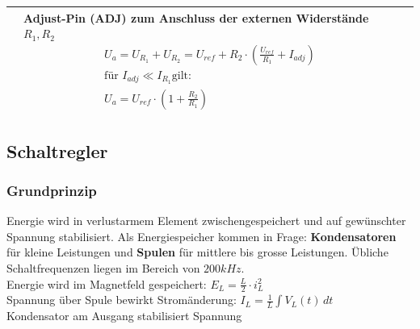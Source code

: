 \begin{longtable}{|l|l|l|}
\begin{minipage}{6cm}
		\end{minipage}
	&
		\begin{minipage}{8cm}
			Adjust-Pin (ADJ) zum Anschluss der externen Widerstände $R_1,R_2$
			\begin{gather*}
				U_a = U_{R_1} + U_{R_2} = U_{ref} + R_2 \cdot 
				\left(\frac{U_{ref}}{R_1} + I_{adj}\right) \\
				\text{für }I_{adj} \ll I_{R_1} \text{gilt:} \\
				U_a = U_{ref} \cdot \left(1+\frac{R_2}{R_1}\right)
			\end{gather*}
		\end{minipage}
	\\ \hline
\end{longtable}

\subsection{Schaltregler}
	\subsubsection{Grundprinzip}
		Energie wird in verlustarmem Element zwischengespeichert und auf gewünschter
		Spannung stabilisiert. Als Energiespeicher kommen in Frage: \textbf{Kondensatoren}
		für kleine Leistungen und \textbf{Spulen} für mittlere bis grosse Leistungen.
		Übliche Schaltfrequenzen liegen im Bereich von $200kHz$. \\
		
		Energie wird im Magnetfeld gespeichert: $E_L = \frac{L}{2} \cdot i_L^2$ \\
		Spannung über Spule bewirkt Stromänderung: $I_L = \frac{1}{L} \int V_L(t) \, dt$ \\
		Kondensator am Ausgang stabilisiert Spannung \\
		
